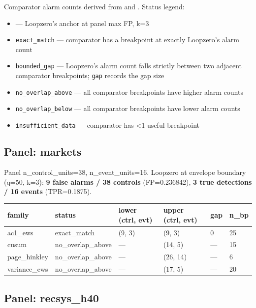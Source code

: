 \documentclass[
  11pt,
]{article}
\newcounter{none} %
\providecommand{\tightlist}{%
  \setlength{\itemsep}{0pt}\setlength{\parskip}{0pt}}
\begin{document}
Comparator alarm counts derived from
\texttt{} and
\texttt{}. Status legend:

\begin{itemize}
\tightlist
\item
  \texttt{} --- Loopzero's anchor at panel
  max FP, k=3
\item
  \texttt{exact\_match} --- comparator has a breakpoint at exactly
  Loopzero's alarm count
\item
  \texttt{bounded\_gap} --- Loopzero's alarm count falls strictly
  between two adjacent comparator breakpoints; \texttt{gap} records the
  gap size
\item
  \texttt{no\_overlap\_above} --- all comparator breakpoints have higher
  alarm counts
\item
  \texttt{no\_overlap\_below} --- all comparator breakpoints have lower
  alarm counts
\item
  \texttt{insufficient\_data} --- comparator has \textless1 useful
  breakpoint
\end{itemize}

\subsection{Panel: markets}\label{panel-markets}

Panel n\_control\_units=38, n\_event\_units=16. Loopzero at envelope
boundary (q=50, k=3): \textbf{9 false alarms / 38 controls}
(FP=0.236842), \textbf{3 true detections / 16 events} (TPR=0.1875).

{\def\LTcaptype{none} %
\begin{longtable}[]{@{}llllll@{}}
\toprule\noalign{}
family & status & lower (ctrl, evt) & upper (ctrl, evt) & gap & n\_bp \\
\midrule\noalign{}
\endhead
\bottomrule\noalign{}
\endlastfoot
ac1\_ews & exact\_match & (9, 3) & (9, 3) & 0 & 25 \\
cusum & no\_overlap\_above & --- & (14, 5) & --- & 15 \\
page\_hinkley & no\_overlap\_above & --- & (26, 14) & --- & 6 \\
variance\_ews & no\_overlap\_above & --- & (17, 5) & --- & 20 \\
\end{longtable}
}

\subsection{Panel: recsys\_h40}\label{panel-recsys_h40}
\end{document}
